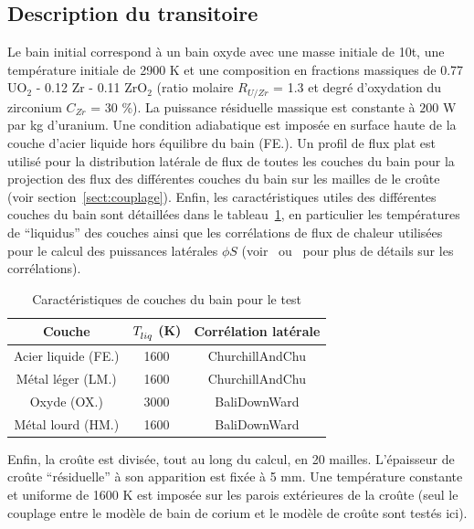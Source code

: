
\subsection{Description du transitoire}
Le bain initial correspond à un bain oxyde avec une masse initiale de 10t, une température initiale de 2900 K et une composition en fractions massiques de 0.77 UO$_2$ - 0.12 Zr - 0.11 ZrO$_2$ (ratio molaire $R_{U/Zr}$ = 1.3 et degré d'oxydation du zirconium $C_{Zr}$ = 30 \%). La puissance résiduelle massique est constante à $200$ W par kg d'uranium. Une condition adiabatique est imposée en surface haute de la couche d'acier liquide hors équilibre du bain (FE.). Un profil de flux plat est utilisé pour la distribution latérale de flux de toutes les couches du bain pour la projection des flux des différentes couches du bain sur les mailles de le croûte (voir section~\ref{sect:couplage}). Enfin, les caractéristiques utiles des différentes couches du bain sont détaillées dans le tableau~\ref{tab:caracteristiques_couches_bain}, en particulier les températures de ``liquidus'' des couches ainsi que les corrélations de flux de chaleur utilisées pour le calcul des puissances latérales $\phi S$ (voir~\cite{Bonnet1999} ou~\cite{Tourniaire2009a} pour plus de détails sur les corrélations).
\begin{table}
	\centering
	\begin{tabular}{ccc} 
	\hline
	Couche & $\temperature{liq}$ (K) & Corrélation latérale\\
	\hline
	Acier liquide (FE.) & 1600 & ChurchillAndChu\\
	Métal léger (LM.) & 1600 & ChurchillAndChu\\
	Oxyde (OX.) & 3000 & BaliDownWard\\
	Métal lourd (HM.) & 1600 & BaliDownWard\\
	\hline
	\end{tabular}	
	\caption{Caractéristiques de couches du bain pour le test} 
	\label{tab:caracteristiques_couches_bain}
\end{table}

Enfin, la croûte est divisée, tout au long du calcul, en 20 mailles. L'épaisseur de croûte ``résiduelle'' à son apparition est fixée à 5 mm. Une température constante et uniforme de 1600 K est imposée sur les parois extérieures de la croûte (seul le couplage entre le modèle de bain de corium et le modèle de croûte sont testés ici).

